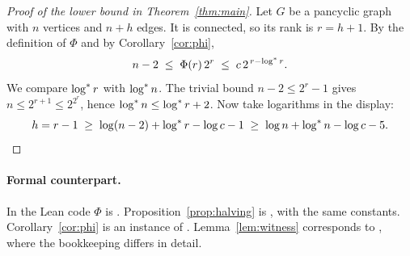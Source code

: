 \begin{proof}[Proof of the lower bound in Theorem~\ref{thm:main}]
Let $G$ be a pancyclic graph with $n$ vertices and $n+h$ edges. It is connected, so its rank is
$r=h+1$. By the definition of $\Phi$ and by Corollary~\ref{cor:phi},
\[
  n-2\;\le\;\Phi(r)\,2^{r}\;\le\;c\,2^{\,r-\log^{*} r}.
\]
We compare $\log^{*} r$ with $\log^{*} n$. The trivial bound $n-2\le2^{r}-1$ gives
$n\le2^{r+1}\le2^{2^{r}}$, hence $\log^{*} n\le\log^{*} r+2$. Now take logarithms in the display:
\[
  h=r-1\;\ge\;\log(n-2)+\log^{*} r-\log c-1\;\ge\;\log n+\log^{*} n-\log c-5.\qedhere
\]
\end{proof}

\paragraph{Formal counterpart.}
In the Lean code $\Phi$ is . Proposition~\ref{prop:halving} is
, with the same constants.
Corollary~\ref{cor:phi} is an instance of . Lemma~\ref{lem:witness}
corresponds to , where the bookkeeping differs in detail.
